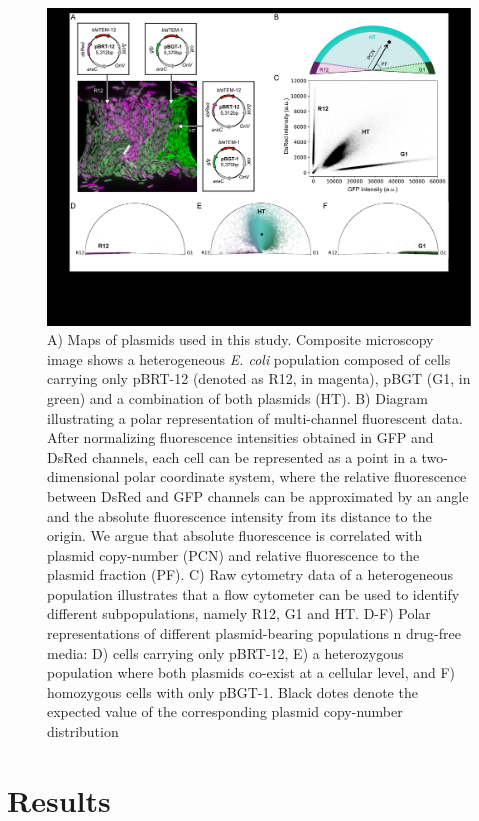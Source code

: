 \documentclass[fleqn,12pt]{wlscirep}
\begin{document}
\begin{figure}[ht!]
\centering
\includegraphics[width=\linewidth]{figures/Figure1.pdf}
\caption{ \small{A) Maps of plasmids used in this study. Composite microscopy image shows a heterogeneous {\em E. coli} population composed of cells carrying only pBRT-12 (denoted as R12, in magenta), pBGT (G1, in green) and a combination of both plasmids (HT).  B) Diagram illustrating a polar representation of multi-channel fluorescent data.  After normalizing fluorescence intensities obtained in GFP and DsRed channels, each cell can be represented as a point in a  two-dimensional polar coordinate system, where the relative fluorescence between DsRed and GFP channels can be approximated by an angle and the absolute fluorescence intensity from its distance to the origin.  We argue that absolute fluorescence is correlated with plasmid copy-number (PCN) and relative fluorescence to the plasmid fraction (PF). C) Raw cytometry data of a heterogeneous population illustrates that a flow cytometer can be used to identify different subpopulations, namely R12, G1 and HT. D-F) Polar representations of different plasmid-bearing populations n drug-free media: D) cells carrying only pBRT-12, E) a heterozygous population where both plasmids co-exist at a cellular level, and F) homozygous cells with only pBGT-1. Black dotes denote the expected value of the corresponding plasmid copy-number distribution}} 
\label{fig:experimental_system}
\end{figure}


\section{Results}
\end{document}
